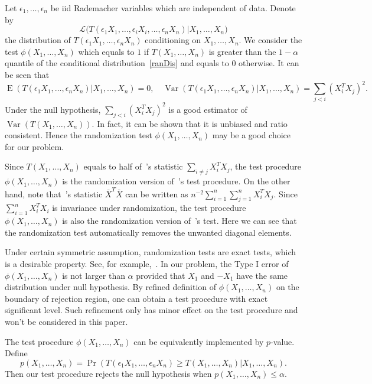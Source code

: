 \documentclass[3p]{elsarticle}
\DeclareMathOperator{\myE}{E}
\DeclareMathOperator{\myVar}{Var}
\theoremstyle{plain}
\theoremstyle{definition}
\theoremstyle{remark}
\begin{document}
Let $\epsilon_1,\ldots,\epsilon_n$ be iid Rademacher variables which are independent of data.
Denote by
\begin{equation}\label{ranDis}
    \mathcal{L}\big(T(\epsilon_1 X_1,\ldots,\epsilon_i X_i,\ldots,\epsilon_n X_n)|X_1,\ldots,X_n\big)
\end{equation}
the distribution of $T(\epsilon_1 X_1,\ldots,\epsilon_n X_n)$ conditioning on $X_1,\ldots,X_n$.
We consider the test $\phi(X_1,\ldots,X_n)$ which equals to $1$ if $T(X_1,\ldots, X_n)$ is greater than the $1-\alpha$ quantile of the conditional distribution~\eqref{ranDis} and equals to $0$ otherwise.
It can be seen that
$$
 \myE(T(\epsilon_1 X_1,\ldots,\epsilon_n X_n)|X_1,\ldots,X_n)=0,
 \quad
 \myVar(T(\epsilon_1 X_1,\ldots,\epsilon_n X_n)|X_1,\ldots,X_n)=\sum_{j<i} (X_i^T X_j)^2.
$$
Under the null hypothesis, $\sum_{j<i} (X_i^T X_j)^2$ is a good estimator of $\myVar(T(X_1,\ldots,X_n))$.
In fact, it can be shown that it is unbiased and ratio consistent.
Hence the randomization test $\phi(X_1,\ldots,X_n)$ may be a good choice for our problem.


 Since $T(X_1,\ldots,X_n)$ equals to half of~\citet{Chen2010A}'s statistic $\sum_{i\neq j}X_i^T X_j$, the test procedure $\phi(X_1,\ldots,X_n)$ is the randomization version of~\citet{Chen2010A}'s test procedure.
 On the other hand, note that~\citet{Bai1996Efiect}'s statistic $\bar{X}^T \bar{X}$ can be written as $n^{-2}\sum_{i=1}^n\sum_{j=1}^n X_i^T X_j$.
 Since $\sum_{i=1}^n X_i^T X_i$ is invariance under randomization, the test procedure $\phi(X_1,\ldots,X_n)$ is also the randomization version of~\citet{Bai1996Efiect}'s test.
 Here we can see that the randomization test automatically removes the unwanted diagonal elements.


Under certain symmetric assumption, randomization tests are exact tests, which is a desirable property.
 See, for example,~\citet[Chapter 15]{Lehmann}.
In our problem, the Type I error of $\phi(X_1,\ldots,X_n)$ is not larger than $\alpha$ provided that $X_1$ and $-X_1$ have the same distribution under null hypothesis.
 By refined definition of $\phi(X_1,\ldots,X_n)$ on the boundary of rejection region, one can obtain a test procedure with exact significant  level. 
Such refinement only has minor effect on the test procedure and won't be considered in this paper.

The test procedure $\phi(X_1,\ldots, X_n)$ can be equivalently implemented by $p$-value. Define 
\begin{equation}\label{firstPvalue}
        p(X_1,\ldots, X_n)
        =\Pr(T(\epsilon_1 X_1,\ldots,\epsilon_n X_n)\geq T( X_1,\ldots,X_n)|X_1,\ldots,X_n).
\end{equation}
Then our test procedure rejects the null hypothesis when $p(X_1,\ldots, X_n)\leq \alpha$. 
\end{document}

